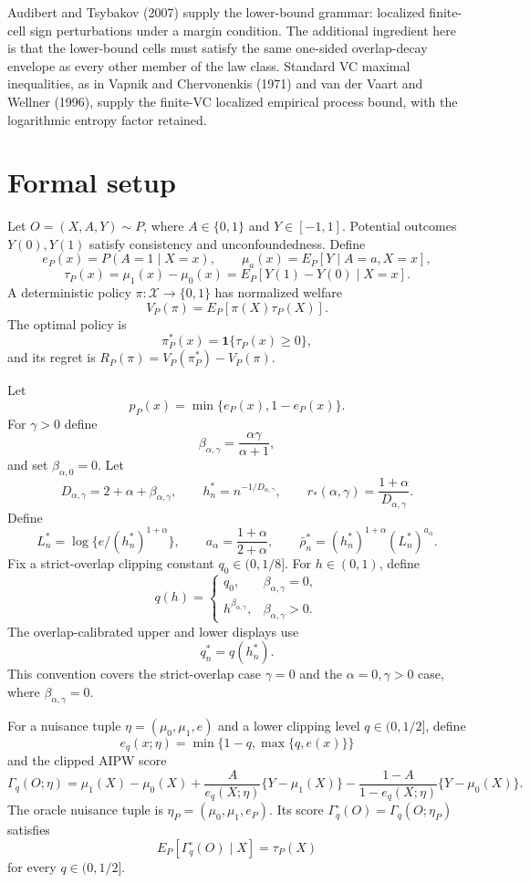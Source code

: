 \documentclass[11pt]{article}
\newcommand{\one}{\mathbf{1}}
\theoremstyle{definition}
\theoremstyle{plain}
\theoremstyle{remark}
\begin{document}
Audibert and Tsybakov (2007) supply the lower-bound grammar: localized
finite-cell sign perturbations under a margin condition.  The additional
ingredient here is that the lower-bound cells must satisfy the same
one-sided overlap-decay envelope as every other member of the law class.
Standard VC maximal inequalities, as in Vapnik and Chervonenkis (1971) and
van der Vaart and Wellner (1996), supply the finite-VC localized empirical
process bound, with the logarithmic entropy factor retained.

\section{Formal setup}
Let \(O=(X,A,Y)\sim P\), where \(A\in\{0,1\}\) and \(Y\in[-1,1]\).  Potential
outcomes \(Y(0),Y(1)\) satisfy consistency and unconfoundedness.  Define
\[
e_P(x)=P(A=1\mid X=x),\qquad
\mu_a(x)=E_P[Y\mid A=a,X=x],
\]
\[
\tau_P(x)=\mu_1(x)-\mu_0(x)=E_P[Y(1)-Y(0)\mid X=x].
\]
A deterministic policy \(\pi:\mathcal X\to\{0,1\}\) has normalized welfare
\[
V_P(\pi)=E_P[\pi(X)\tau_P(X)].
\]
The optimal policy is
\[
\pi_P^*(x)=\one\{\tau_P(x)\ge0\},
\]
and its regret is \(R_P(\pi)=V_P(\pi_P^*)-V_P(\pi)\).

Let
\[
p_P(x)=\min\{e_P(x),1-e_P(x)\}.
\]
For \(\gamma>0\) define
\[
\beta_{\alpha,\gamma}=\frac{\alpha\gamma}{\alpha+1},
\]
and set \(\beta_{\alpha,0}=0\).  Let
\[
D_{\alpha,\gamma}=2+\alpha+\beta_{\alpha,\gamma},\qquad
h_n^*=n^{-1/D_{\alpha,\gamma}},\qquad
r_*(\alpha,\gamma)=\frac{1+\alpha}{D_{\alpha,\gamma}}.
\]
Define
\[
L_n^*=\log\{e/(h_n^*)^{1+\alpha}\},\qquad
a_\alpha=\frac{1+\alpha}{2+\alpha},\qquad
\bar\rho_n^*=(h_n^*)^{1+\alpha}(L_n^*)^{a_\alpha}.
\]
Fix a strict-overlap clipping constant \(q_0\in(0,1/8]\).  For
\(h\in(0,1)\), define
\[
q(h)=
\begin{cases}
q_0, & \beta_{\alpha,\gamma}=0,\\
h^{\beta_{\alpha,\gamma}}, & \beta_{\alpha,\gamma}>0.
\end{cases}
\]
The overlap-calibrated upper and lower displays use
\[
q_n^*=q(h_n^*).
\]
This convention covers the strict-overlap case \(\gamma=0\) and the
\(\alpha=0,\gamma>0\) case, where \(\beta_{\alpha,\gamma}=0\).

For a nuisance tuple \(\eta=(\mu_0,\mu_1,e)\) and a lower clipping level
\(q\in(0,1/2]\), define
\[
e_q(x;\eta)=\min\{1-q,\max\{q,e(x)\}\}
\]
and the clipped AIPW score
\[
\Gamma_q(O;\eta)=\mu_1(X)-\mu_0(X)
+\frac{A}{e_q(X;\eta)}\{Y-\mu_1(X)\}
-\frac{1-A}{1-e_q(X;\eta)}\{Y-\mu_0(X)\}.
\]
The oracle nuisance tuple is \(\eta_P=(\mu_0,\mu_1,e_P)\).  Its score
\(\Gamma_q^\circ(O)=\Gamma_q(O;\eta_P)\) satisfies
\[
E_P[\Gamma_q^\circ(O)\mid X]=\tau_P(X)
\]
for every \(q\in(0,1/2]\).
\end{document}
